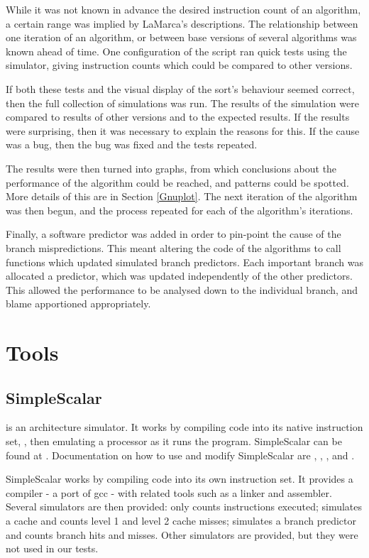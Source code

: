While it was not known in advance the desired instruction count of an algorithm,
a certain range was implied by LaMarca's descriptions. The relationship between
one iteration of an algorithm, or between base versions of several algorithms
was known ahead of time. One configuration of the  script ran quick
tests using the  simulator, giving instruction counts which could
be compared to other versions. 

If both these tests and the visual display of the sort's behaviour seemed
correct, then the full collection of simulations was run. The results of the
simulation were compared to results of other versions and to the expected
results. If the results were surprising, then it was necessary to explain the
reasons for this. If the cause was a bug, then the bug was fixed and the tests
repeated.

The results were then turned into graphs, from which conclusions about the
performance of the algorithm could be reached, and patterns could be spotted.
More details of this are in Section \ref{Gnuplot}. The next iteration of the
algorithm was then begun, and the process repeated for each of the algorithm's
iterations.

Finally, a software predictor was added in order to pin-point the cause of the
branch mispredictions. This meant altering the code of the algorithms to call
functions which updated simulated branch predictors. Each important branch was
allocated a predictor, which was updated independently of the other predictors.
This allowed the performance to be analysed down to the individual branch, and
blame apportioned appropriately.

\section{Tools}

\subsection{SimpleScalar}  is an architecture simulator. It
works by compiling code into its native instruction set, , then
emulating a processor as it runs the program. SimpleScalar can be found at
. Documentation on how to use and modify
SimpleScalar are \cite{Burger97}, \cite{Austin02}, \cite{Tutorialv4},
\cite{Tutorialv2} and \cite{SimpleScalarUserGuide}.

SimpleScalar works by compiling code into its own instruction set. It provides a
compiler - a port of gcc - with related tools such as a linker and assembler.
Several simulators are then provided:  only counts instructions
executed;  simulates a cache and counts level 1 and level 2 cache
misses;  simulates a branch predictor and counts branch hits and
misses. Other simulators are provided, but they were not used in our tests.

